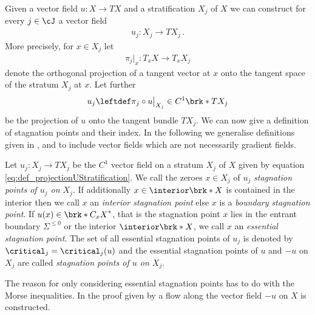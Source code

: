 Given a vector field $u\colon X\to TX$ and a stratification $X_j$ of $X$ we can construct for every
$j\in\cJ$ a vector field
\begin{align*}
  u_j\colon X_j\to TX_j\,.
\end{align*}
More precisely, for $x\in X_j$ let
\begin{align}
  \pi_j\big\vert_x\colon T_xX\to T_xX_{j}\label{eq:def_projectionStratification}
\end{align}
denote the orthogonal projection of a tangent vector at $x$ onto the tangent space of the stratum $X_j$ at $x$.
Let further
\begin{align}
  u_j\leftdef\pi_j\circ u\big\vert_{X_j}\in C^1\brk*{TX_j}\label{eq:def_projectionUStratification}
\end{align}
be the projection of $u$ onto the tangent bundle $TX_j$. We can now give a definition
of stagnation points and their index. 
In the following we generalise definitions given in \cite[p.138f]{Shelton1980}, \cite[§5]{Morse1969} and \cite[p.282f]{Morse1970}
to include vector fields which are not necessarily gradient fields.
\begin{definition}\label{df:stagnationPoints}
  Let $u_j\colon X_j\to TX_j$ be the $C^1$ vector field on a stratum $X_j$ of $X$ given by equation \eqref{eq:def_projectionUStratification}.
  We call the zeroes $x\in X_j$ of $u_j$ \emph{stagnation points of $u_j$ on $X_j$}.
  If additionally $x\in\openX$ is contained in the interior
  then we call $x$ an \emph{interior stagnation point}
  else $x$ is a \emph{boundary stagnation point}.
  If $u(x)\in\brk*{C_xX}^*$, that is the stagnation point $x$ lies in the entrant boundary $\Sigma^{\leq0}$ or the interior $\interior\brk*{X}$, we call $x$ an \emph{essential stagnation point}.
  The set of all essential stagnation points of $u_j$ is denoted by $\critical_j=\critical_j(u)$ and
  the essential stagnation points of $u$ and $-u$ on $X_j$ are called \emph{stagnation points of $u$ on $X_j$}.
\end{definition}
The reason for only considering essential stagnation points has to do with the Morse inequalities.
In the proof given by \cite{Handron2002} a flow along the vector field $-u$ on $X$ is constructed.
